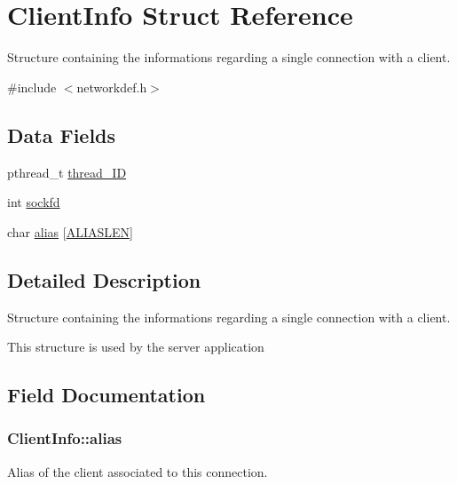 \hypertarget{structClientInfo}{}\section{Client\+Info Struct Reference}
\label{structClientInfo}


Structure containing the informations regarding a single connection with a client.  




{\ttfamily \#include $<$networkdef.\+h$>$}

\subsection*{Data Fields}
\begin{DoxyCompactItemize}
\item 
pthread\+\_\+t \hyperlink{structClientInfo_a473c67886fcb2ae0b18b04e6890870ba}{thread\+\_\+\+ID}
\item 
int \hyperlink{structClientInfo_a2e6d4c5d276144166df3a511592b9c49}{sockfd}
\item 
char \hyperlink{structClientInfo_abeb73c8567e22ae0d8b01f51e08b3260}{alias} \mbox{[}\hyperlink{networkdef_8h_aa07ba58ae52cf11992b7e112454a3eea}{A\+L\+I\+A\+S\+L\+EN}\mbox{]}
\end{DoxyCompactItemize}


\subsection{Detailed Description}
Structure containing the informations regarding a single connection with a client. 

This structure is used by the server application 

\subsection{Field Documentation}
\subsubsection[{\texorpdfstring{alias}{alias}}]{\setlength{\rightskip}{0pt plus 5cm}Client\+Info\+::alias}\hypertarget{structClientInfo_abeb73c8567e22ae0d8b01f51e08b3260}{}\label{structClientInfo_abeb73c8567e22ae0d8b01f51e08b3260}
Alias of the client associated to this connection. 
